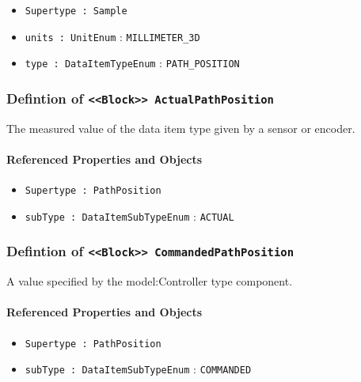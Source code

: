 \begin{itemize}
\item \texttt{Supertype : Sample}

\item \texttt{units : UnitEnum} : \texttt{MILLIMETER_3D}

\item \texttt{type : DataItemTypeEnum} : \texttt{PATH_POSITION}

\end{itemize}
\FloatBarrier
\subsubsection{Defintion of \texttt{<<Block>> ActualPathPosition}}
  \label{type:ActualPathPosition}

\FloatBarrier

The measured value of the data item type given by a sensor or encoder.

\FloatBarrier
\paragraph{Referenced Properties and Objects}

\begin{itemize}
\item \texttt{Supertype : PathPosition}

\item \texttt{subType : DataItemSubTypeEnum} : \texttt{ACTUAL}

\end{itemize}
\FloatBarrier
\subsubsection{Defintion of \texttt{<<Block>> CommandedPathPosition}}
  \label{type:CommandedPathPosition}

\FloatBarrier

A value specified by the {model:Controller} type component.

\FloatBarrier
\paragraph{Referenced Properties and Objects}

\begin{itemize}
\item \texttt{Supertype : PathPosition}

\item \texttt{subType : DataItemSubTypeEnum} : \texttt{COMMANDED}

\end{itemize}
\FloatBarrier
